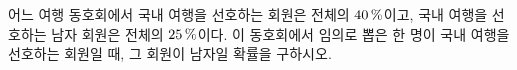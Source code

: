 어느 여행 동호회에서 국내 여행을 선호하는 회원은 전체의 $40\mkern3mu \%$이고, 국내 여행을 선호하는 남자 회원은 전체의 $25\mkern3mu \%$이다. 이 동호회에서 임의로 뽑은 한 명이 국내 여행을 선호하는 회원일 때, 그 회원이 남자일 확률을 구하시오.
